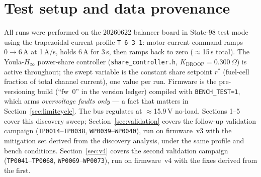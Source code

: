 \documentclass[11pt]{article}
\newcommand{\code}[1]{\texttt{#1}}
\begin{document}
\begin{abstract}
A fifth campaign (Section~\ref{sec:v6}; \code{TP0102}--\code{TP0120},
\code{WP0121}--\code{WP0124}, firmware~v6) validates the profile de-rating and
the reference slew, and relocates the failure mode a second time. The
share-bound excursion, now de-rated to $0.3\,I_\mathrm{max}$, carries an order of
magnitude less current than the source knee, and all three combined-profile runs
at 6\,A complete across the full span of the clip bound --- the bound no longer
predicts survival. One residual remains in band: at the exact upper band edge the
open-loop-to-closed-loop handover opens both channels for 5.9\,ms and drops the
bus to 12.19\,V, because the governor floor demands half the total current from a
channel carrying 61\,mA at the crossing. The slew limits the reference rate, but
the exposure is its magnitude. The one truncation of the campaign is not
share-mediated at all: at an $I_\mathrm{max}$ raised to 8\,A the battery rail
collapses ohmically through a $1.35\,\Omega$ source --- four times softer than
the fuel-cell side --- into the logic regulator's dropout region, with the share
loop tracking to $\pm0.02$ and the bus in regulation throughout. Replaying the
dwell filter over the campaign shows that no battery-rail undervoltage threshold
separates that stop from healthy runs which sag lower still, which identifies the
discriminator as a sub-millisecond transient rather than the logged operating
point.
\end{abstract}

\section{Test setup and data provenance}

All runs were performed on the 20260622 balancer board in State-98 test mode using the
trapezoidal current profile \code{T 6 3 1}: motor current command ramps
$0\rightarrow6$\,A at 1\,A/s, holds 6\,A for 3\,s, then ramps back to zero
($\approx$15\,s total). The Youla-$H_\infty$ power-share controller
(\code{share\_controller.h}, $K_\mathrm{DROOP}=0.300\,\Omega$) is active throughout;
the swept variable is the constant share setpoint $r^\ast$ (fuel-cell fraction of
total channel current), one value per run. Firmware is the pre-versioning build
(``fw~0'' in the version ledger) compiled with \code{BENCH\_TEST=1}, which arms
\emph{overvoltage faults only} --- a fact that matters in
Section~\ref{sec:limitcycle}. The bus regulates at $\approx$15.9\,V no-load.
Sections 1--5 cover this discovery sweep; Section~\ref{sec:validation} covers the
follow-up validation campaign (\code{TP0014}--\code{TP0038},
\code{WP0039}--\code{WP0040}), run on firmware~v3 with the mitigation set derived
from the discovery analysis, under the same profile and bench conditions.
Section~\ref{sec:v4} covers the second validation campaign
(\code{TP0041}--\code{TP0068}, \code{WP0069}--\code{WP0073}), run on firmware~v4
with the fixes derived from the first.
\end{document}
